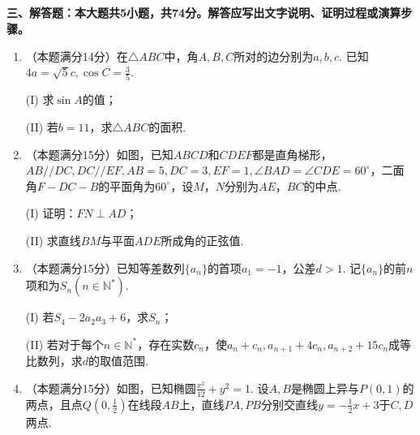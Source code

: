 \documentclass[UTF8]{ctexart}
\newcommand{\tmstrong}[1]{\textbf{#1}}
\begin{document}
\

\

\

\

{\tmstrong{三、解答题：本大题共5小题，共74分。解答应写出文字说明、证明过程或演算步骤。}}
\begin{enumerate}
  \item （本题满分14分）在$\triangle \mathit{ABC}$中，角$A, B,
  C$所对的边分别为$a, b, c$. 已知$4 a = \sqrt{5} c, \cos C =
  \frac{3}{5}$.
  
  (I) 求$\sin A$的值；
  
  (II) 若$b = 11$，求$\triangle \mathit{ABC}$的面积.
  
  \item
  （本题满分15分）如图，已知$\mathit{ABCD}$和$\mathit{CDEF}$都是直角梯形，$\mathit{AB}
  / / \mathit{DC}, \mathit{DC} / / \mathit{EF}, \mathit{AB} = 5, \mathit{DC} =
  3, \mathit{EF} = 1, \angle \mathit{BAD} = \angle \mathit{CDE} =
  60^{\circ}$，二面角$F - \mathit{DC} -
  B$的平面角为$60^{\circ}$，设$M$，$N$分别为$\mathit{AE}$，$\mathit{BC}$的中点.
  
  \begin{multicols}{2}
    (I) 证明：$\mathit{FN} \perp \mathit{AD}$；
    
    (II) 求直线$\mathit{BM}$与平面$\mathit{ADE}$所成角的正弦值.
    
    {}
  \end{multicols}
  
  \item （本题满分15分）已知等差数列$\{ a_n \}$的首项$a_1 = -
  1$，公差$d > 1$. 记$\{ a_n \}$的前$n$项和为$S_n (n \in
  \mathbb{N}^{\ast})$.
  
  (I) 若$S_4 - 2 a_2 a_3 + 6$，求$S_n$；
  
  (II) 若对于每个$n \in \mathbb{N}^{\ast}$，存在实数$c_n$，使$a_n
  + c_n, a_{n + 1} + 4 c_n, a_{n + 2} + 15
  c_n$成等比数列，求$d$的取值范围.
  
  \item （本题满分15分）如图，已知椭圆$\frac{x^2}{12} + y^2 =
  1$. 设$A, B$是椭圆上异与$P (0, 1)$的两点，且点$Q \left( 0,
  \frac{1}{2} \right)$在线段$\mathit{AB}$上，直线$\mathit{PA},
  \mathit{PB}$分别交直线$y = - \frac{1}{2} x + 3$于$C, D$两点.
  

\end{enumerate}
\end{document}
